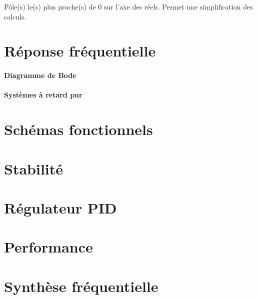 \documentclass[10pt, twocolumn]{article}
\begin{document}
			Pôle(s) le(s) plus proche(s) de 0 sur l'axe des réels. Permet une simplification des calculs.
			
	\section*{Réponse fréquentielle}
		
		\paragraph{Diagramme de Bode}
		
		\paragraph{Systèmes à retard pur}
	
	\section*{Schémas fonctionnels}
	
	\section*{Stabilité}
	
	\section*{Régulateur PID}
	
	\section*{Performance}
	
	\section*{Synthèse fréquentielle}
	
\end{document}
